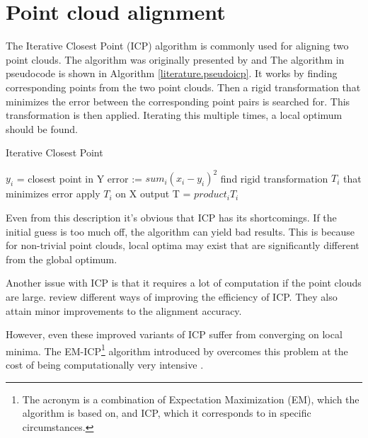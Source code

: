 \section{Point cloud alignment} \label{literature.alignment}



The Iterative Closest Point (ICP) algorithm is commonly used for aligning two point clouds. The algorithm was originally presented by \citet{besl1992method} and \citet{chen1991object} The algorithm in pseudocode is shown in Algorithm \ref{literature.pseudoicp}. It works by finding corresponding points from the two point clouds. Then a rigid transformation that minimizes the error between the corresponding point pairs is searched for. This transformation is then applied. Iterating this multiple times, a local optimum should be found.

\begin{algorithm}
\caption{Iterative Closest Point}
\label{literature.pseudoicp}
\begin{algorithmic}
            \State $y_i$ = closest point in Y
        \EndFor
        \State error := $sum_i (x_i-y_i)^2$
        \State find rigid transformation $T_i$ that minimizes error
        \State apply $T_i$ on X
    \EndFor
    \State \Return output T = $product_i T_i$
\end{algorithmic}
\end{algorithm}

Even from this description it's obvious that ICP has its shortcomings. If the initial guess is too much off, the algorithm can yield bad results. This is because for non-trivial point clouds, local optima may exist that are significantly different from the global optimum.

Another issue with ICP is that it requires a lot of computation if the point clouds are large. \citet{rusinkiewicz2001efficient} review different ways of improving the efficiency of ICP. They also attain minor improvements to the alignment accuracy.

However, even these improved variants of ICP suffer from converging on local minima. The EM-ICP\footnote{The acronym is a combination of Expectation Maximization (EM), which the algorithm is based on, and ICP, which it corresponds to in specific circumstances.} algorithm introduced by \citet{granger2006multi} overcomes this problem at the cost of being computationally very intensive \citep{tamaki2010softassign}.

